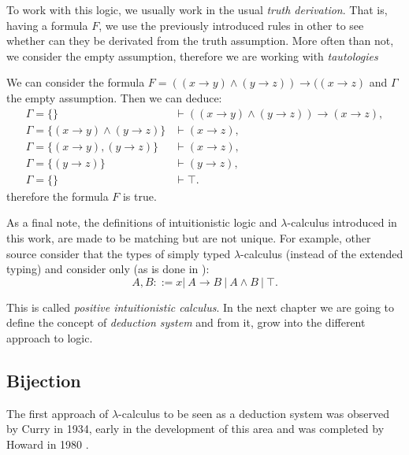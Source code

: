 To work with this logic, we usually work in the usual \emph{truth derivation}. That is, having a formula $F$, we use the previously introduced rules in other to see whether can they be derivated from the truth assumption. More often than not, we consider the empty assumption, therefore we are working with \emph{tautologies}

\begin{example}
  We can consider the formula $F=((x\to y) \land (y\to z)) \to ((x \to z)$ and $\Gamma$ the empty assumption. Then we can deduce:
  \begin{align*}
    \Gamma=\{\}& \vdash    ((x\to y) \land (y\to z)) \to (x\to z),\\
    \Gamma=\{(x\to y)\land (y\to z)\} & \vdash    (x \to z),\\
    \Gamma=\{(x\to y), (y\to z)\} & \vdash    (x \to z),\\
    \Gamma=\{ (y\to z)\} & \vdash    (y \to z),\\
    \Gamma=\{\} & \vdash \top.
    \end{align*}
therefore the formula $F$ is true.
\end{example}





As a final note, the definitions of intuitionistic logic and $\lambda$-calculus introduced in this work, are made to be matching but are not unique. For example, other source consider that the types of simply typed $\lambda$-calculus (instead of the extended typing) and consider only (as is done in \cite[Section 6.5]{selinger2008lecture}):
$$A,B ::= x |\ A\to B\ |\ A \land B \ |\ \top .$$

This is called \emph{positive intuitionistic calculus}. In the next chapter we are going to define the concept of \emph{deduction system} and from it, grow into the different approach to logic.



\subsection{Bijection}
The first approach of $\lambda$-calculus to be seen as a deduction system was observed by Curry in 1934\cite{curry1934functionality}, early in the development of this area and was completed by Howard in 1980 \cite{howard1980formulae}. \\%


